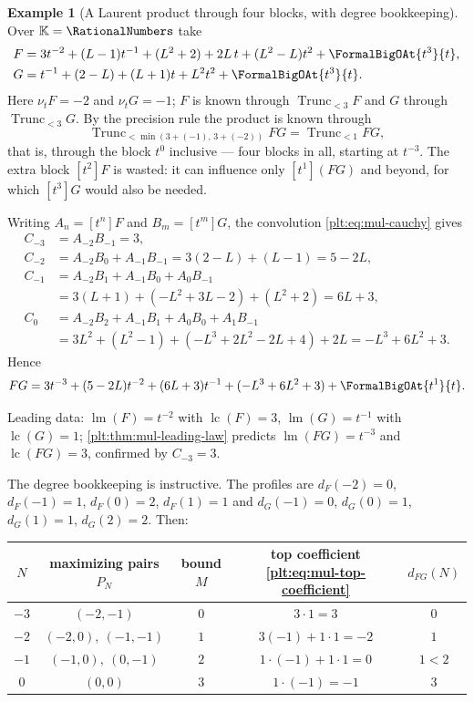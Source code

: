\documentclass[11pt,oneside]{article}
\theoremstyle{plain}
\theoremstyle{definition}
\newtheorem{example}[theorem]{Example}
\theoremstyle{remark}
\newcommand{\K}{\mathbb{K}}
\newcommand{\ordt}{\nu_{t}}                              %
\DeclareMathOperator{\lm}{lm}
\DeclareMathOperator{\lc}{lc}
\newcommand{\Trunc}[2]{\operatorname{Trunc}_{<#2}#1}     %
\newcommand{\dprofile}[1]{d_{#1}}                        %
\begin{document}
\begin{example}[A Laurent product through four blocks, with degree
bookkeeping]
\label{plt:ex:mul-worked-laurent}
Over $\K=\RationalNumbers$ take
\begin{align*}
 F&=3t^{-2}+(L-1)t^{-1}+(L^2+2)+2L\,t+(L^2-L)t^2
   +\FormalBigOAt{t^{3}}{t},\\
 G&=t^{-1}+(2-L)+(L+1)t+L^2t^2+\FormalBigOAt{t^{3}}{t}.
\end{align*}
Here $\ordt F=-2$ and $\ordt G=-1$; $F$ is known through $\Trunc{F}{3}$ and
$G$ through $\Trunc{G}{3}$.  By the precision rule the product is known
through
\[
 \Trunc{FG}{\min(3+(-1),\,3+(-2))}=\Trunc{FG}{1},
\]
that is, through the block $t^{0}$ inclusive --- four blocks in all, starting
at $t^{-3}$.  The extra block $[t^2]F$ is wasted: it can influence only
$[t^{1}](FG)$ and beyond, for which $[t^{3}]G$ would also be needed.

Writing $A_n=[t^n]F$ and $B_m=[t^m]G$, the convolution
\eqref{plt:eq:mul-cauchy} gives
\begin{align*}
 C_{-3}&=A_{-2}B_{-1}=3,\\
 C_{-2}&=A_{-2}B_{0}+A_{-1}B_{-1}
        =3(2-L)+(L-1)=5-2L,\\
 C_{-1}&=A_{-2}B_{1}+A_{-1}B_{0}+A_{0}B_{-1}\\
       &=3(L+1)+(-L^2+3L-2)+(L^2+2)=6L+3,\\
 C_{0}&=A_{-2}B_{2}+A_{-1}B_{1}+A_{0}B_{0}+A_{1}B_{-1}\\
      &=3L^2+(L^2-1)+(-L^3+2L^2-2L+4)+2L
      =-L^3+6L^2+3 .
\end{align*}
Hence
\begin{equation}\label{plt:eq:mul-worked-laurent}
 FG=3t^{-3}+(5-2L)t^{-2}+(6L+3)t^{-1}+(-L^3+6L^2+3)
   +\FormalBigOAt{t^{1}}{t}.
\end{equation}

Leading data: $\lm(F)=t^{-2}$ with $\lc(F)=3$, $\lm(G)=t^{-1}$ with
$\lc(G)=1$; \cref{plt:thm:mul-leading-law} predicts $\lm(FG)=t^{-3}$ and
$\lc(FG)=3$, confirmed by $C_{-3}=3$.

The degree bookkeeping is instructive.  The profiles are
$\dprofile{F}(-2)=0$, $\dprofile{F}(-1)=1$, $\dprofile{F}(0)=2$,
$\dprofile{F}(1)=1$ and $\dprofile{G}(-1)=0$, $\dprofile{G}(0)=1$,
$\dprofile{G}(1)=1$, $\dprofile{G}(2)=2$.  Then:

\begin{center}
\begin{tabular}{@{}ccccc@{}}
\hline
$N$ & maximizing pairs $P_N$ & bound $M$ & top coefficient
 \eqref{plt:eq:mul-top-coefficient} & $\dprofile{FG}(N)$ \\
\hline
$-3$ & $(-2,-1)$ & $0$ & $3\cdot1=3$ & $0$ \\
$-2$ & $(-2,0),\ (-1,-1)$ & $1$ & $3(-1)+1\cdot1=-2$ & $1$ \\
$-1$ & $(-1,0),\ (0,-1)$ & $2$ & $1\cdot(-1)+1\cdot1=0$ & $1<2$ \\
$0$  & $(0,0)$ & $3$ & $1\cdot(-1)=-1$ & $3$ \\
\hline
\end{tabular}
\end{center}


\end{example}
\end{document}
